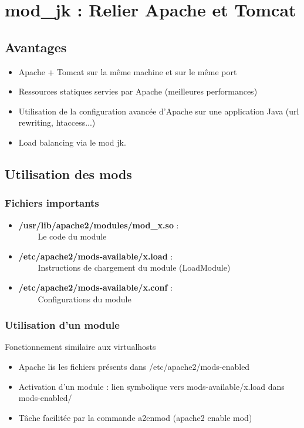 \section{mod\_jk : Relier Apache et Tomcat}

\subsection{Avantages}
\begin{frame}
	\begin{itemize}
		\item Apache + Tomcat sur la même machine et sur le même port
		\item Ressources statiques servies par Apache (meilleures performances)
		\item Utilisation de la configuration avancée d'Apache sur une application Java (url rewriting, htaccess...)
		\item Load balancing via le mod jk.
	\end{itemize}
\end{frame}

\subsection{Utilisation des mods}
\begin{frame}
	\frametitle{Fichiers importants}
	
	\begin{itemize}
		\item \textbf{/usr/lib/apache2/modules/mod\_x.so} :\\~~~~ Le code du module
		\item \textbf{/etc/apache2/mods-available/x.load} :\\~~~~ Instructions de chargement du module (LoadModule)
		\item \textbf{/etc/apache2/mods-available/x.conf} :\\~~~~ Configurations du module
	\end{itemize}
	
\end{frame}

\begin{frame}
	\frametitle{Utilisation d'un module}

	Fonctionnement similaire aux virtualhosts
	
	\begin{itemize}
		\item Apache lis les fichiers présents dans /etc/apache2/mods-enabled
		\item Activation d'un module : lien symbolique vers mods-available/x.load dans mods-enabled/
		\item Tâche facilitée par la commande a2enmod (apache2 enable mod)	
	\end{itemize}
	
\end{frame}

